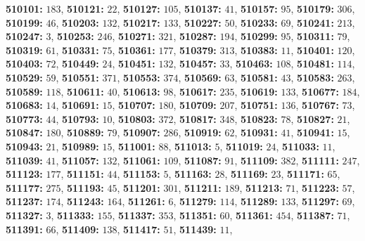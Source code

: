 \textsf{\bfseries 510101:} $183$, \textsf{\bfseries 510121:} $22$, \textsf{\bfseries 510127:} $105$, \textsf{\bfseries 510137:} $41$, \textsf{\bfseries 510157:} $95$, \textsf{\bfseries 510179:} $306$, \textsf{\bfseries 510199:} $46$, \textsf{\bfseries 510203:} $132$, \textsf{\bfseries 510217:} $133$, \textsf{\bfseries 510227:} $50$, \textsf{\bfseries 510233:} $69$, \textsf{\bfseries 510241:} $213$, \textsf{\bfseries 510247:} $3$, \textsf{\bfseries 510253:} $246$, \textsf{\bfseries 510271:} $321$, \textsf{\bfseries 510287:} $194$, \textsf{\bfseries 510299:} $95$, \textsf{\bfseries 510311:} $79$, \textsf{\bfseries 510319:} $61$, \textsf{\bfseries 510331:} $75$, \textsf{\bfseries 510361:} $177$, \textsf{\bfseries 510379:} $313$, \textsf{\bfseries 510383:} $11$, \textsf{\bfseries 510401:} $120$, \textsf{\bfseries 510403:} $72$, \textsf{\bfseries 510449:} $24$, \textsf{\bfseries 510451:} $132$, \textsf{\bfseries 510457:} $33$, \textsf{\bfseries 510463:} $108$, \textsf{\bfseries 510481:} $114$, \textsf{\bfseries 510529:} $59$, \textsf{\bfseries 510551:} $371$, \textsf{\bfseries 510553:} $374$, \textsf{\bfseries 510569:} $63$, \textsf{\bfseries 510581:} $43$, \textsf{\bfseries 510583:} $263$, \textsf{\bfseries 510589:} $118$, \textsf{\bfseries 510611:} $40$, \textsf{\bfseries 510613:} $98$, \textsf{\bfseries 510617:} $235$, \textsf{\bfseries 510619:} $133$, \textsf{\bfseries 510677:} $184$, \textsf{\bfseries 510683:} $14$, \textsf{\bfseries 510691:} $15$, \textsf{\bfseries 510707:} $180$, \textsf{\bfseries 510709:} $207$, \textsf{\bfseries 510751:} $136$, \textsf{\bfseries 510767:} $73$, \textsf{\bfseries 510773:} $44$, \textsf{\bfseries 510793:} $10$, \textsf{\bfseries 510803:} $372$, \textsf{\bfseries 510817:} $348$, \textsf{\bfseries 510823:} $78$, \textsf{\bfseries 510827:} $21$, \textsf{\bfseries 510847:} $180$, \textsf{\bfseries 510889:} $79$, \textsf{\bfseries 510907:} $286$, \textsf{\bfseries 510919:} $62$, \textsf{\bfseries 510931:} $41$, \textsf{\bfseries 510941:} $15$, \textsf{\bfseries 510943:} $21$, \textsf{\bfseries 510989:} $15$, \textsf{\bfseries 511001:} $88$, \textsf{\bfseries 511013:} $5$, \textsf{\bfseries 511019:} $24$, \textsf{\bfseries 511033:} $11$, \textsf{\bfseries 511039:} $41$, \textsf{\bfseries 511057:} $132$, \textsf{\bfseries 511061:} $109$, \textsf{\bfseries 511087:} $91$, \textsf{\bfseries 511109:} $382$, \textsf{\bfseries 511111:} $247$, \textsf{\bfseries 511123:} $177$, \textsf{\bfseries 511151:} $44$, \textsf{\bfseries 511153:} $5$, \textsf{\bfseries 511163:} $28$, \textsf{\bfseries 511169:} $23$, \textsf{\bfseries 511171:} $65$, \textsf{\bfseries 511177:} $275$, \textsf{\bfseries 511193:} $45$, \textsf{\bfseries 511201:} $301$, \textsf{\bfseries 511211:} $189$, \textsf{\bfseries 511213:} $71$, \textsf{\bfseries 511223:} $57$, \textsf{\bfseries 511237:} $174$, \textsf{\bfseries 511243:} $164$, \textsf{\bfseries 511261:} $6$, \textsf{\bfseries 511279:} $114$, \textsf{\bfseries 511289:} $133$, \textsf{\bfseries 511297:} $69$, \textsf{\bfseries 511327:} $3$, \textsf{\bfseries 511333:} $155$, \textsf{\bfseries 511337:} $353$, \textsf{\bfseries 511351:} $60$, \textsf{\bfseries 511361:} $454$, \textsf{\bfseries 511387:} $71$, \textsf{\bfseries 511391:} $66$, \textsf{\bfseries 511409:} $138$, \textsf{\bfseries 511417:} $51$, \textsf{\bfseries 511439:} $11$, 
